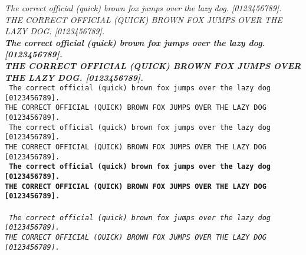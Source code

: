 \documentclass{PalisadesLakesArticle}
\begin{document}
\textsf{\textsl{\textmd{%
The correct official (quick) brown fox jumps over the lazy dog. [0123456789].\\
THE CORRECT OFFICIAL (QUICK) BROWN FOX JUMPS OVER THE LAZY DOG. [0123456789].\\ }}}
\textsf{\textsl{}}
\textsf{\textsl{\textbf{%
The correct official (quick) brown fox jumps over the lazy dog. [0123456789].\\
THE CORRECT OFFICIAL (QUICK) BROWN FOX JUMPS OVER THE LAZY DOG. [0123456789].\\ }}}
\textsf{\textsl{}}
\newpage
\texttt{}
\texttt{}
\texttt{%
The correct official (quick) brown fox jumps over the lazy dog [0123456789].\\
THE CORRECT OFFICIAL (QUICK) BROWN FOX JUMPS OVER THE LAZY DOG [0123456789].\\ }
\texttt{\textmd{%
The correct official (quick) brown fox jumps over the lazy dog [0123456789].\\
THE CORRECT OFFICIAL (QUICK) BROWN FOX JUMPS OVER THE LAZY DOG [0123456789].\\ }}
\texttt{}
\texttt{\textbf{%
The correct official (quick) brown fox jumps over the lazy dog [0123456789].\\
THE CORRECT OFFICIAL (QUICK) BROWN FOX JUMPS OVER THE LAZY DOG [0123456789].\\ }}
\texttt{}
 \\
\texttt{\textsl{%
The correct official (quick) brown fox jumps over the lazy dog [0123456789].\\
THE CORRECT OFFICIAL (QUICK) BROWN FOX JUMPS OVER THE LAZY DOG [0123456789].\\ }}



\end{document}
